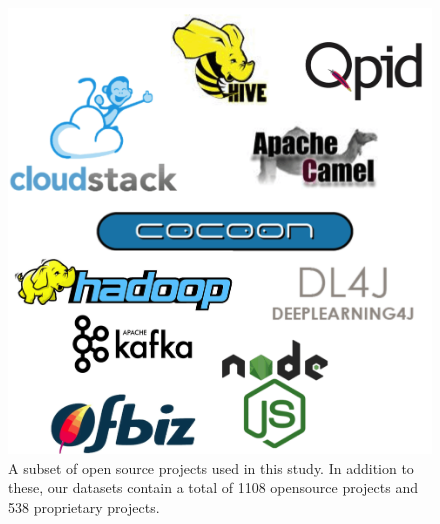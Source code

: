 \begin{figure}[t!]
	\centering
	\includegraphics[width=0.8\linewidth]{images/sample/sample_oss.png}
	\caption{A subset of open source projects used in this study. In addition to these, our datasets contain a total of 1108 opensource projects and 538 proprietary projects.}
	\label{fig:sample_datasets}
\end{figure}

